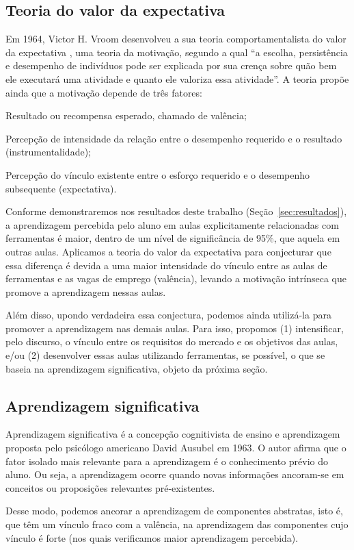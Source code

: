 \subsection{Teoria do valor da expectativa}\label{sec:tve}

Em 1964, Victor H. Vroom desenvolveu a sua teoria comportamentalista do valor da expectativa \cite{Petri}, uma teoria da motivação, segundo a qual ``a escolha, persistência e desempenho de indivíduos pode ser explicada por sua crença sobre quão bem ele executará uma atividade e quanto ele valoriza essa atividade''.
A teoria propõe ainda que a motivação depende de três fatores: 
\begin{compactitem}
	\item Resultado ou recompensa esperado, chamado de valência;
	\item Percepção de intensidade da relação entre o desempenho requerido e o resultado (instrumentalidade);
	\item Percepção do vínculo existente entre o esforço requerido e o desempenho subsequente (expectativa).
\end{compactitem}

Conforme demonstraremos nos resultados deste trabalho (Seção~\ref{sec:resultados}), a aprendizagem percebida pelo aluno em aulas explicitamente relacionadas com ferramentas é maior, dentro de um nível de significância de 95\%, que aquela em outras aulas.
Aplicamos a teoria do valor da expectativa para conjecturar que essa diferença é devida a uma maior intensidade do vínculo entre as aulas de ferramentas e as vagas de emprego (valência), levando a motivação intrínseca que promove a aprendizagem nessas aulas.

Além disso, upondo verdadeira essa conjectura, podemos ainda utilizá-la para promover a aprendizagem nas demais aulas.
Para isso, propomos (1) intensificar, pelo discurso, o vínculo entre os requisitos do mercado e os objetivos das aulas, e/ou (2) desenvolver essas aulas utilizando ferramentas, se possível, o que se baseia na aprendizagem significativa, objeto da próxima seção.

\subsection{Aprendizagem significativa}\label{sec:as}

Aprendizagem significativa \cite{Pelizzari2002} é a concepção cognitivista de ensino e aprendizagem proposta pelo psicólogo americano David Ausubel em 1963.
O autor afirma que o fator isolado mais relevante para a aprendizagem é o conhecimento prévio do aluno.
Ou seja, a aprendizagem ocorre quando novas informações ancoram-se em conceitos ou proposições relevantes pré-existentes.

Desse modo, podemos ancorar a aprendizagem de componentes abstratas, isto é, que têm um vínculo fraco com a valência, na aprendizagem das componentes cujo vínculo é forte (nos quais verificamos maior aprendizagem percebida).

